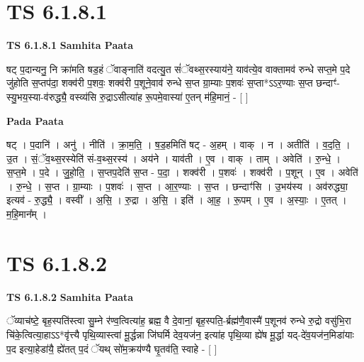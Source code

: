 \documentclass[17pt]{extarticle}
\begin{document}
\section*{ TS 6.1.8.1 }

\textbf{TS 6.1.8.1 } \newline
\textbf{Samhita Paata} \newline

षट् प॒दान्यनु॒ नि क्रा॑मति षड॒हं ॅवाङ्नाति॑ वदत्यु॒त सं॑ॅवथ्स॒रस्याय॑ने॒ याव॑त्ये॒व वाक्तामव॑ रुन्धे सप्त॒मे प॒दे जु॑होति स॒प्तप॑दा॒ शक्व॑री प॒शवः॒ शक्व॑री प॒शूने॒वाव॑ रुन्धे स॒प्त ग्रा॒म्याः प॒शवः॑ स॒प्ता*ऽऽर॒ण्याः स॒प्त छन्दाꣳ॑-स्यु॒भय॒स्या-व॑रुद्ध्यै॒ वस्व्य॑सि रु॒द्राऽसीत्या॑ह रू॒पमे॒वास्या॑ ए॒तन् म॑हि॒मानं॒ - [  ] \newline

\textbf{Pada Paata} \newline

षट् । प॒दानि॑ । अनु॑ । नीति॑ । क्रा॒म॒ति॒ । ष॒ड॒हमिति॑ षट् - अ॒हम् । वाक् । न । अतीति॑ । व॒द॒ति॒ । उ॒त । सं॒ॅव॒थ्स॒रस्येति॑ सं-व॒थ्स॒रस्य॑ । अय॑ने । याव॑ती । ए॒व । वाक् । ताम् । अवेति॑ । रु॒न्धे॒ । स॒प्त॒मे । प॒दे । जु॒हो॒ति॒ । स॒प्तप॒देति॑ स॒प्त - प॒दा॒ । शक्व॑री । प॒शवः॑ । शक्व॑री । प॒शून् । ए॒व । अवेति॑ । रु॒न्धे॒ । स॒प्त । ग्रा॒म्याः । प॒शवः॑ । स॒प्त । आ॒र॒ण्याः । स॒प्त । छन्दाꣳ॑सि । उ॒भय॑स्य । अव॑रुद्ध्या॒ इत्यव॑ - रु॒द्ध्यै॒ । वस्वी᳚ । अ॒सि॒ । रु॒द्रा । अ॒सि॒ । इति॑ । आ॒ह॒ । रू॒पम् । ए॒व । अ॒स्याः॒ । ए॒तत् । म॒हि॒मान᳚म् ।  \newline




\section*{ TS 6.1.8.2 }

\textbf{TS 6.1.8.2 } \newline
\textbf{Samhita Paata} \newline

ॅव्याच॑ष्टे॒ बृह॒स्पति॑स्त्वा सु॒म्ने र॑ण्व॒त्वित्या॑ह॒ ब्रह्म॒ वै दे॒वानां॒ बृह॒स्पति॒-र्ब्रह्म॑णै॒वास्मै॑ प॒शूनव॑ रुन्धे रु॒द्रो वसु॑भि॒रा चि॑के॒त्वित्या॒हाऽऽ*वृ॑त्त्यै पृथि॒व्यास्त्वा॑ मू॒र्द्धन्ना जि॑घर्मि देव॒यज॑न॒ इत्या॑ह पृथि॒व्या ह्ये॑ष मू॒र्द्धा यद्-दे॑व॒यज॑न॒मिडा॑याः प॒द इत्या॒हेडा॑यै॒ ह्ये॑तत् प॒दं ॅयथ् सो॑म॒क्रय॑ण्यै घृ॒तव॑ति॒ स्वाहे - [  ] \newline
\end{document}
